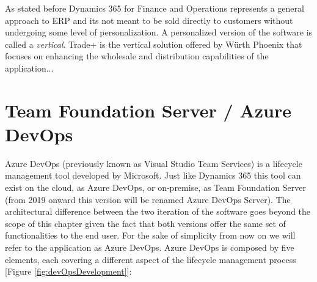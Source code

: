 As stated before Dynamics 365 for Finance and Operations represents a general approach to ERP and its not meant to be sold directly to customers without undergoing some level of personalization. A personalized version of the software is called a \textit{vertical}. Trade+ is the vertical solution offered by Würth Phoenix that focuses on enhancing the wholesale and distribution capabilities of the application...

\section{Team Foundation Server / Azure DevOps} 

Azure DevOps (previously known as Visual Studio Team Services) is a lifecycle management tool developed by Microsoft. Just like Dynamics 365 this tool can exist on the cloud, as Azure DevOps, or on-premise, as Team Foundation Server (from 2019 onward this version will be renamed Azure DevOps Server). The architectural difference between the two iteration of the software goes beyond the scope of this chapter given the fact that both versions offer the same set of functionalities to the end user. For the sake of simplicity from now on we will refer to the application as Azure DevOps. Azure DevOps is composed by five elements, each covering a different aspect of the lifecycle management process [Figure \ref{fig:devOpsDevelopment}]:

